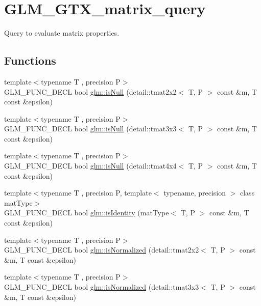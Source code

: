 \hypertarget{group__gtx__matrix__query}{}\section{G\+L\+M\+\_\+\+G\+T\+X\+\_\+matrix\+\_\+query}
\label{group__gtx__matrix__query}


Query to evaluate matrix properties.  


\subsection*{Functions}
\begin{DoxyCompactItemize}
\item 
{\footnotesize template$<$typename T , precision P$>$ }\\G\+L\+M\+\_\+\+F\+U\+N\+C\+\_\+\+D\+E\+CL bool \hyperlink{group__gtx__matrix__query_gaf7e38680b67a3589a262d281660e4694}{glm\+::is\+Null} (detail\+::tmat2x2$<$ T, P $>$ const \&m, T const \&epsilon)
\item 
{\footnotesize template$<$typename T , precision P$>$ }\\G\+L\+M\+\_\+\+F\+U\+N\+C\+\_\+\+D\+E\+CL bool \hyperlink{group__gtx__matrix__query_ga7a6ef9f174fec0224214ff5ba6c27ba4}{glm\+::is\+Null} (detail\+::tmat3x3$<$ T, P $>$ const \&m, T const \&epsilon)
\item 
{\footnotesize template$<$typename T , precision P$>$ }\\G\+L\+M\+\_\+\+F\+U\+N\+C\+\_\+\+D\+E\+CL bool \hyperlink{group__gtx__matrix__query_ga5b8d7b0c7bf1d48ff8df10321440a61a}{glm\+::is\+Null} (detail\+::tmat4x4$<$ T, P $>$ const \&m, T const \&epsilon)
\item 
{\footnotesize template$<$typename T , precision P, template$<$ typename, precision $>$ class mat\+Type$>$ }\\G\+L\+M\+\_\+\+F\+U\+N\+C\+\_\+\+D\+E\+CL bool \hyperlink{group__gtx__matrix__query_gafc1ce12c738b8c5d007179e615609330}{glm\+::is\+Identity} (mat\+Type$<$ T, P $>$ const \&m, T const \&epsilon)
\item 
{\footnotesize template$<$typename T , precision P$>$ }\\G\+L\+M\+\_\+\+F\+U\+N\+C\+\_\+\+D\+E\+CL bool \hyperlink{group__gtx__matrix__query_gaae7339fac94c86ed741f20b6915682ab}{glm\+::is\+Normalized} (detail\+::tmat2x2$<$ T, P $>$ const \&m, T const \&epsilon)
\item 
{\footnotesize template$<$typename T , precision P$>$ }\\G\+L\+M\+\_\+\+F\+U\+N\+C\+\_\+\+D\+E\+CL bool \hyperlink{group__gtx__matrix__query_gab4c4106cd851951bad5e78a83bfc75dd}{glm\+::is\+Normalized} (detail\+::tmat3x3$<$ T, P $>$ const \&m, T const \&epsilon)

\end{DoxyCompactItemize}
